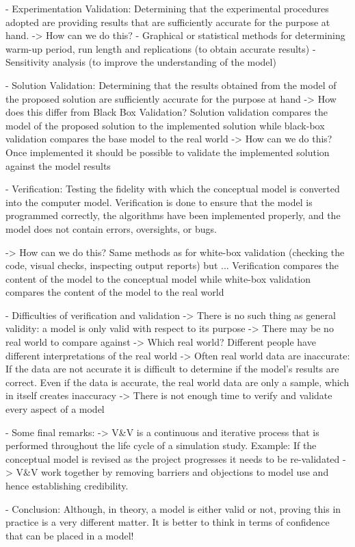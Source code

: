     - Experimentation Validation: Determining that the experimental procedures adopted are providing results that are sufficiently accurate for the purpose at hand.
    	-> How can we do this?
    		- Graphical or statistical methods for determining warm-up period, run length and replications (to obtain accurate results)
			- Sensitivity analysis (to improve the understanding of the model)
	
	- Solution Validation: Determining that the results obtained from the model of the proposed solution are sufficiently accurate for the purpose at hand
		-> How does this differ from Black Box Validation? Solution validation compares the model of the proposed solution to the implemented solution while black-box validation compares the base model to the real world
		-> How can we do this? Once implemented it should be possible to validate the implemented solution against the model results
		
	- Verification: Testing the fidelity with which the conceptual model is converted into the computer model. Verification is done to ensure that the model is programmed correctly, the algorithms have been implemented properly, and the model does not contain errors, oversights, or bugs.

		-> How can we do this? Same methods as for white-box validation (checking the code, visual checks, inspecting output reports) but ... Verification compares the content of the model to the conceptual model while white-box validation compares the content of the model to the real world
		
	- Difficulties of verification and validation
		-> There is no such thing as general validity: a model is only valid with respect to its purpose
		-> There may be no real world to compare against
		-> Which real world? Different people have different interpretations of the real world
		->  Often real world data are inaccurate: If the data are not accurate it is difficult to determine if the model's results are correct. Even if the data is accurate, the real world data are only a sample, which in itself creates inaccuracy
		-> There is not enough time to verify and validate every aspect of a model
		
	- Some final remarks:
		-> V\&V is a continuous and iterative process that is performed throughout the life cycle of a simulation study.
			Example: If the conceptual model is revised as the project progresses it needs to be re-validated
		-> V\&V work together by removing barriers and objections to model use and hence establishing credibility.
		
	- Conclusion: Although, in theory, a model is either valid or not, proving this in practice is a very different matter. It is better to think in terms of confidence that can be placed in a model!